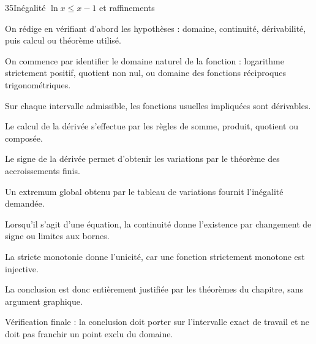 \documentclass[11pt,a4paper]{article}
\begin{document}
\begin{corrbox}{35}{Inégalité $\ln x\le x-1$ et raffinements}

\begin{methodebox}
On rédige en vérifiant d'abord les hypothèses : domaine, continuité, dérivabilité, puis calcul ou théorème utilisé.
\end{methodebox}

On commence par identifier le domaine naturel de la fonction : logarithme strictement positif, quotient non nul, ou domaine des fonctions réciproques trigonométriques.


Sur chaque intervalle admissible, les fonctions usuelles impliquées sont dérivables.


Le calcul de la dérivée s'effectue par les règles de somme, produit, quotient ou composée.


Le signe de la dérivée permet d'obtenir les variations par le théorème des accroissements finis.


Un extremum global obtenu par le tableau de variations fournit l'inégalité demandée.


Lorsqu'il s'agit d'une équation, la continuité donne l'existence par changement de signe ou limites aux bornes.


La stricte monotonie donne l'unicité, car une fonction strictement monotone est injective.


La conclusion est donc entièrement justifiée par les théorèmes du chapitre, sans argument graphique.


\begin{attentionbox}
Vérification finale : la conclusion doit porter sur l'intervalle exact de travail et ne doit pas franchir un point exclu du domaine.
\end{attentionbox}

\end{corrbox}
\end{document}
